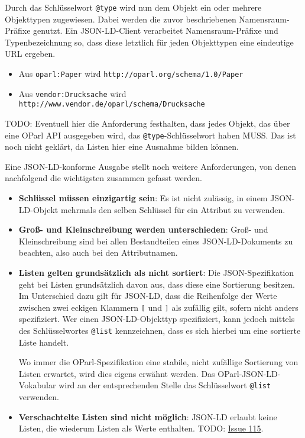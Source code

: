 \documentclass[,a4paper]{article}
\begin{document}
Durch das Schlüsselwort \texttt{@type} wird nun dem Objekt ein oder
mehrere Objekttypen zugewiesen. Dabei werden die zuvor beschriebenen
Namensraum-Präfixe genutzt. Ein JSON-LD-Client verarbeitet
Namensraum-Präfixe und Typenbezeichnung so, dass diese letztlich für
jeden Objekttypen eine eindeutige URL ergeben.

\begin{itemize}
\itemsep1pt\parskip0pt
\item
  Aus \texttt{oparl:Paper} wird
  \texttt{http://oparl.org/schema/1.0/Paper}
\item
  Aus \texttt{vendor:Drucksache} wird
  \texttt{http://www.vendor.de/oparl/schema/Drucksache}
\end{itemize}

TODO: Eventuell hier die Anforderung festhalten, dass jedes Objekt, das
über eine OParl API ausgegeben wird, das \texttt{@type}-Schlüsselwort
haben MUSS. Das ist noch nicht geklärt, da Listen hier eine Ausnahme
bilden können.

Eine JSON-LD-konforme Ausgabe stellt noch weitere Anforderungen, von
denen nachfolgend die wichtigsten zusammen gefasst werden.

\begin{itemize}
\item
  \textbf{Schlüssel müssen einzigartig sein}: Es ist nicht zulässig, in
  einem JSON-LD-Objekt mehrmals den selben Schlüssel für ein Attribut zu
  verwenden.
\item
  \textbf{Groß- und Kleinschreibung werden unterschieden}: Groß- und
  Kleinschreibung sind bei allen Bestandteilen eines JSON-LD-Dokuments
  zu beachten, also auch bei den Attributnamen.
\item
  \textbf{Listen gelten grundsätzlich als nicht sortiert}: Die
  JSON-Spezifikation geht bei Listen grundsätzlich davon aus, dass diese
  eine Sortierung besitzen. Im Unterschied dazu gilt für JSON-LD, dass
  die Reihenfolge der Werte zwischen zwei eckigen Klammern \texttt{{[}}
  und \texttt{{]}} als zufällig gilt, sofern nicht anders spezifiziert.
  Wer einen JSON-LD-Objekttyp spezifiziert, kann jedoch mittels des
  Schlüsselwortes \texttt{@list} kennzeichnen, dass es sich hierbei um
  eine sortierte Liste handelt.

  Wo immer die OParl-Spezifikation eine stabile, nicht zufällige
  Sortierung von Listen erwartet, wird dies eigens erwähnt werden. Das
  OParl-JSON-LD-Vokabular wird an der entsprechenden Stelle das
  Schlüsselwort \texttt{@list} verwenden.
\item
  \textbf{Verschachtelte Listen sind nicht möglich}: JSON-LD erlaubt
  keine Listen, die wiederum Listen als Werte enthalten. TODO:
  \href{https://github.com/OParl/specs/issues/115}{Issue 115}.
\end{itemize}
\end{document}
